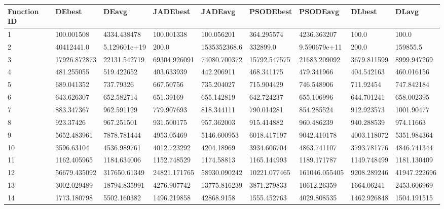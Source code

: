 \begin{table}[h!]
\centering
 \begin{tabular}{|p{0.8cm}|p{1.6cm}|p{1.6cm}|p{1.6cm}|p{1.6cm}|p{1.6cm}|p{1.6cm}|p{1.6cm}|p{1.6cm}|} 
 \hline
 Function ID  & DEbest & DEavg & JADEbest & JADEavg & PSODEbest & PSODEavg & DLbest & DLavg \\ [0.5ex] 
 \hline
1  & 100.001508 & 4334.438478 & 100.001338 & 100.056201 & 364.295574 & 4236.363207 & 100.0 & 100.0 \\ 
 \hline
2  & 40412441.0 & 5.129601e+19 & 200.0 & 1535352368.6 & 332899.0 & 9.590679e+11 & 200.0 & 159855.5 \\ 
 \hline
3  & 17926.872873 & 22131.542719 & 69304.926091 & 74080.700372 & 15792.547575 & 21683.209092 & 3679.811599 & 8999.947269 \\ 
 \hline
4  & 481.255055 & 519.422652 & 403.633939 & 442.206911 & 468.341175 & 479.341966 & 404.542163 & 460.016156 \\ 
 \hline
5  & 689.041352 & 737.79326 & 667.50756 & 735.204027 & 715.904429 & 746.548906 & 711.92454 & 747.842184 \\ 
 \hline
6  & 643.626307 & 652.582714 & 651.39169 & 655.142819 & 642.724237 & 655.106996 & 644.701241 & 658.002395 \\ 
 \hline
7  & 883.347367 & 962.591129 & 779.907693 & 818.344111 & 790.014281 & 854.285524 & 912.923573 & 1001.90477 \\ 
 \hline
8  & 923.37426 & 967.251501 & 931.500175 & 957.362003 & 915.414882 & 960.486239 & 940.288539 & 974.11663 \\ 
 \hline
9  & 5652.483961 & 7878.781444 & 4953.05469 & 5146.600953 & 6018.417197 & 9042.410178 & 4003.118072 & 5351.984364 \\ 
 \hline
10  & 3596.63104 & 4536.989761 & 4012.723292 & 4204.18969 & 3934.606704 & 4863.741107 & 3793.781776 & 4846.741344 \\ 
 \hline
11  & 1162.405965 & 1184.634006 & 1152.748529 & 1174.58813 & 1165.144993 & 1189.171787 & 1149.748499 & 1181.130409 \\ 
 \hline
12  & 56679.435092 & 317650.61349 & 24821.171765 & 58930.090242 & 10221.077465 & 161046.055405 & 9208.289246 & 41947.222696 \\ 
 \hline
13  & 3002.029489 & 18794.835991 & 4276.907742 & 13775.816239 & 3871.279833 & 10612.26359 & 1664.06241 & 2453.606969 \\ 
 \hline
14  & 1773.180798 & 5502.160382 & 1496.219858 & 42868.9158 & 1555.452763 & 4029.808535 & 1462.926848 & 1504.191515 \\ 

\end{tabular}
\end{table}

